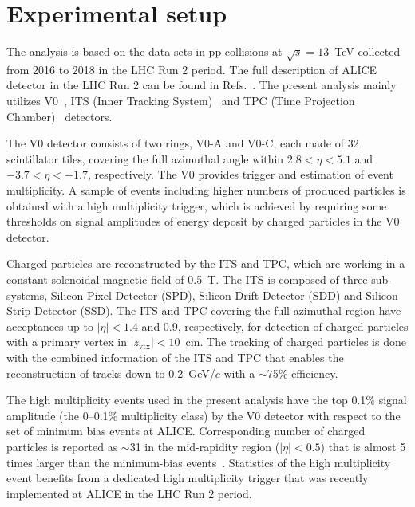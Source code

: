 

\section{Experimental setup}
\label{sec:experiment}

The analysis is based on the data sets in pp collisions at $\sqrt{s} = 13$~TeV collected from 2016 to 2018 in the LHC Run 2 period.  The full description of ALICE detector in the LHC Run 2 can be found in Refs.~\cite{Aamodt:2008zz,Abelev:2014ffa}. The present analysis mainly utilizes V0~\cite{Abbas:2013taa}, ITS (Inner Tracking System)~\cite{aliceITS} and TPC (Time Projection Chamber)~\cite{aliceTPC} detectors.


The V0 detector consists of two rings, V0-A and V0-C, each made of 32 scintillator tiles, covering the full azimuthal angle within $2.8 < \eta < 5.1$ and $-3.7 < \eta < -1.7$, respectively. The V0 provides trigger and estimation of event multiplicity. A sample of events including higher numbers of produced particles is obtained with a high multiplicity trigger, which is achieved by requiring some thresholds on signal amplitudes of energy deposit by charged particles in the V0 detector.

Charged particles are reconstructed by the ITS and TPC, which are working in a constant solenoidal magnetic field of 0.5~T.  The ITS is composed of three sub-systems, Silicon Pixel Detector (SPD), Silicon Drift Detector (SDD) and Silicon Strip Detector (SSD). The ITS and TPC covering the full azimuthal region have acceptances up to $|\eta| < 1.4$ and 0.9, respectively, for detection of charged particles with a primary vertex in $|z_\mathrm{vtx}| < 10$~cm. The tracking of charged particles is done with the combined information of the ITS and TPC that enables the reconstruction of tracks down to 0.2~GeV/$c$ with a $\sim $75\% efficiency.


The high multiplicity events used in the present analysis have the top 0.1\%  signal amplitude (the 0--0.1\% multiplicity class) by the V0 detector with respect to the set of minimum bias events at ALICE. Corresponding number of charged particles is reported as $\sim$31 in the mid-rapidity region ($|\eta|<0.5$) that is almost 5 times larger than the minimum-bias events~\cite{}.  Statistics of the high multiplicity event benefits from a dedicated high multiplicity trigger that was recently implemented at ALICE  in the LHC Run 2 period.  
 


